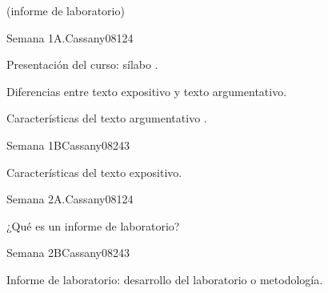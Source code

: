 \begin{syllabus}
\begin{goals}
(informe de laboratorio)
\end{goals}

\begin{outcomes}
\end{outcomes}

\begin{unit}{Semana 1A.}{Cassany08}{12}{4}
   \begin{topics}
      \item Presentación del curso: sílabo .
      \item Diferencias entre texto expositivo y texto argumentativo. 
      \item Características del texto argumentativo .
   \end{topics}
   \begin{learningoutcomes}
      \item 
   \end{learningoutcomes}
\end{unit}

\begin{unit}{Semana 1B}{Cassany08}{24}{3}
   \begin{topics}
      \item Características del texto expositivo.
   \end{topics}

   \begin{learningoutcomes}
      \item 
      \item
      \item 
      \end{learningoutcomes}
\end{unit}

\begin{unit}{Semana 2A.}{Cassany08}{12}{4}
   \begin{topics}
      \item ¿Qué es un informe de laboratorio? 
   \end{topics}
   \begin{learningoutcomes}
      \item 
   \end{learningoutcomes}
\end{unit}

\begin{unit}{Semana 2B}{Cassany08}{24}{3}
   \begin{topics}
      \item Informe de laboratorio: desarrollo del laboratorio o metodología.
   \end{topics}


\end{unit}
\end{syllabus}
